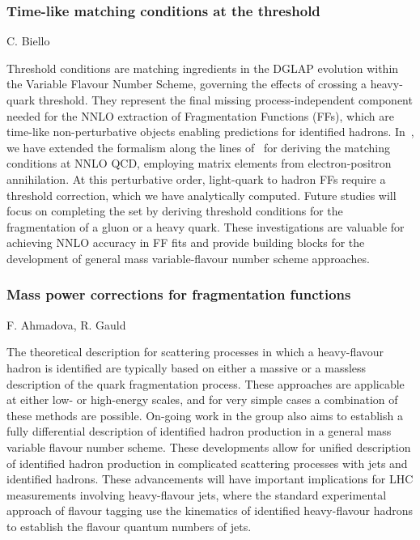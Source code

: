 \documentclass{FBR_Bericht_2025}
\begin{document}
\begin{refsection}
\subsubsection{Time-like matching conditions at the threshold}
\begin{Namen}
C. Biello
\end{Namen}
Threshold conditions are matching ingredients in the DGLAP evolution within the Variable Flavour Number Scheme, governing the effects of crossing a heavy-quark threshold. They represent the final missing process-independent component needed for the NNLO extraction of Fragmentation Functions (FFs), which are time-like non-perturbative objects enabling predictions for identified hadrons. In~, we have extended the formalism along the lines of~ for deriving the matching conditions at NNLO QCD, employing matrix elements from electron-positron annihilation. At this perturbative order, light-quark to hadron FFs require a threshold correction, which we have analytically computed. Future studies will focus on completing the set by deriving threshold conditions for the fragmentation of a gluon or a heavy quark. These investigations are valuable for achieving NNLO accuracy in FF fits and provide building blocks for the development of general mass variable-flavour number scheme approaches.
%
\subsubsection{Mass power corrections for fragmentation functions}
\begin{Namen}
F. Ahmadova, R. Gauld
\end{Namen}
The theoretical description for scattering processes in which a heavy-flavour hadron is identified are typically based on either a massive or a massless description of the quark fragmentation process. These approaches are applicable at either low- or high-energy scales, and for very simple cases a combination of these methods are possible.
On-going work in the group also aims to establish a fully differential description of identified hadron production in a general mass variable flavour number scheme. These developments allow for unified description of identified hadron production in complicated scattering processes with jets and identified hadrons.
These advancements will have important implications for LHC measurements involving heavy-flavour jets, where the standard experimental approach of flavour tagging use the kinematics of identified heavy-flavour hadrons to establish the flavour quantum numbers of jets.
%

\end{refsection}
\end{document}
